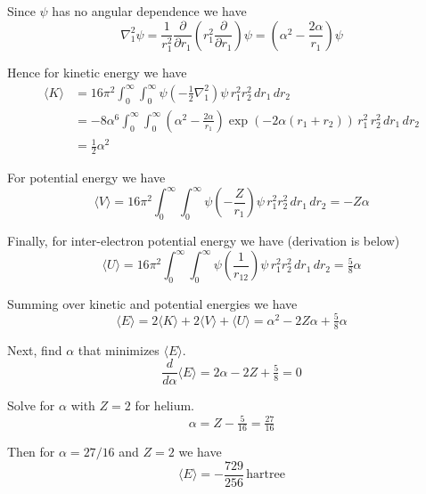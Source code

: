 \documentclass[12pt]{article}
\begin{document}
Since $\psi$ has no angular dependence we have
\begin{equation*}
\nabla^2_1\psi=\frac{1}{r_1^2}\frac{\partial}{\partial r_1}
\left(r_1^2\frac{\partial}{\partial r_1}\right)\psi
=\left(\alpha^2-\frac{2\alpha}{r_1}\right)\psi
\end{equation*}

Hence for kinetic energy we have
\begin{align*}
\langle K\rangle
&=
16\pi^2\int_0^\infty\int_0^\infty\psi\left(-\frac{1}{2}\nabla_1^2\right)\psi
\,r_1^2r_2^2
\,dr_1\,dr_2
\\
&=-8\alpha^6\int_0^\infty\int_0^\infty
\left(\alpha^2-\frac{2\alpha}{r_1}\right)\exp\left(-2\alpha(r_1+r_2)\right)
\,r_1^2\,r_2^2
\,dr_1\,dr_2
\\
&=\tfrac{1}{2}\alpha^2\tag{2}
\end{align*}

For potential energy we have
\begin{equation*}
\langle V\rangle
=
16\pi^2\int_0^\infty\int_0^\infty\psi\left(-\frac{Z}{r_1}\right)\psi
\,r_1^2r_2^2
\,dr_1\,dr_2
=-Z\alpha\tag{3}
\end{equation*}

Finally, for inter-electron potential energy we have (derivation is below)
\begin{equation*}
\langle U\rangle
=
16\pi^2\int_0^\infty\int_0^\infty\psi\left(\frac{1}{r_{12}}\right)\psi
\,r_1^2r_2^2
\,dr_1\,dr_2
=\tfrac{5}{8}\alpha
\tag{4}
\end{equation*}

Summing over kinetic and potential energies we have
\begin{equation*}
\langle E\rangle=2\langle K\rangle+2\langle V\rangle+\langle U\rangle=\alpha^2-2Z\alpha+\tfrac{5}{8}\alpha
\end{equation*}

Next, find $\alpha$ that minimizes $\langle E\rangle$.
\begin{equation*}
\frac{d}{d\alpha}\langle E\rangle=2\alpha-2Z+\tfrac{5}{8}=0
\end{equation*}

Solve for $\alpha$ with $Z=2$ for helium.
\begin{equation*}
\alpha=Z-\tfrac{5}{16}=\tfrac{27}{16}
\end{equation*}

Then for $\alpha=27/16$ and $Z=2$ we have
\begin{equation*}
\langle E\rangle=-\frac{729}{256}\,\text{hartree}
\end{equation*}
\end{document}
